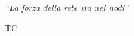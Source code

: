 \documentclass[a4paper, 11pt, oneside]{Tesi}  %
\begin{document}


\pagestyle{empty}  %



\mainmatter	  %
\pagestyle{fancy}  %




\clearpage  %

\pagestyle{empty}  %

\null\vfill
\textit{``La forza della rete sta nei nodi''}

\begin{flushright}
TC
\end{flushright}

\vfill\vfill\vfill\vfill\vfill\vfill\null
\clearpage  %

\pagestyle{fancy}  %
\end{document}
